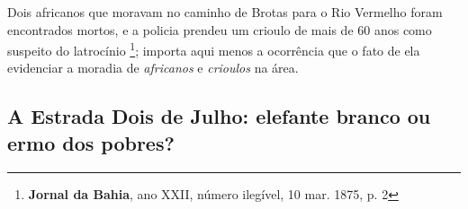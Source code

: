 Dois africanos que moravam no caminho de Brotas para o Rio Vermelho foram encontrados mortos, e a policia prendeu um crioulo de mais de 60 anos como suspeito do latrocínio \footnote{\textbf{Jornal da Bahia}, ano XXII, número ilegível, 10 mar. 1875, p. 2}; importa aqui menos a ocorrência que o fato de ela evidenciar a moradia de \textit{africanos} e \textit{crioulos} na área.

\subsection{A Estrada Dois de Julho: elefante branco ou ermo dos pobres?}\label{subsec:e2j}


